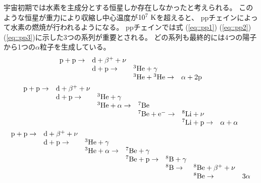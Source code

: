 宇宙初期では水素を主成分とする恒星しか存在しなかったと考えられる。
このような恒星が重力により収縮し中心温度が$10^7~{\rm K}$を超えると、
ppチェインによって水素の燃焼が行われるようになる。
ppチェインでは式 (\ref{eq::pp1}) (\ref{eq::pp2}) (\ref{eq::pp3})に示した3つの系列が重要とされる。
どの系列も最終的には4つの陽子から1つの$\alpha$粒子を生成している。
\begin{gather}
  \begin{array}{llll}
    {\rm p} + {\rm p} \rightarrow & {\rm d} + \beta^{+} + \nu & &\\
    & {\rm d} + {\rm p} \rightarrow & {}^{3}{\rm He} + \gamma &\\
    & & {}^{3}{\rm He} + {}^{3}{\rm He} \rightarrow & \alpha +2{\rm p}
  \end{array}\label{eq::pp1}\\  
  \begin{array}{llllll}
    {\rm p} + {\rm p} \rightarrow & {\rm d} + \beta^{+} +\nu & & & &\\
    & {\rm d} + {\rm p} \rightarrow & {}^{3}{\rm He} + \gamma & & &\\
    & & {}^{3}{\rm He} + \alpha \rightarrow & {}^{7}{\rm Be} & &\\
    & & & {}^{7}{\rm Be} + {\rm e}^{-} \rightarrow & {}^{8}{\rm Li} + \nu &\\
    & & & & {}^{7}{\rm Li} + {\rm p} \rightarrow & \alpha + \alpha
  \end{array}\label{eq::pp2}\\
  \begin{array}{lllllll}
    {\rm p} + {\rm p} \rightarrow & {\rm d} + \beta^{+} + \nu & & & & &\\
    & {\rm d} + {\rm p} \rightarrow & {}^{3}{\rm He} + \gamma & & & &\\
    & & {}^{3}{\rm He} + \alpha \rightarrow & {}^{7}{\rm Be} + \gamma & & &\\
    & & & {}^{7}{\rm Be} + {\rm p} \rightarrow & {}^{8}{\rm B} + \gamma & &\\
    & & & & {}^{8}{\rm B} \rightarrow & {}^{8}{\rm Be} + \beta^{+} + \nu &\\
    & & & & & {}^{8}{\rm Be} \rightarrow & 3\alpha
  \end{array}\label{eq::pp3}
\end{gather}

